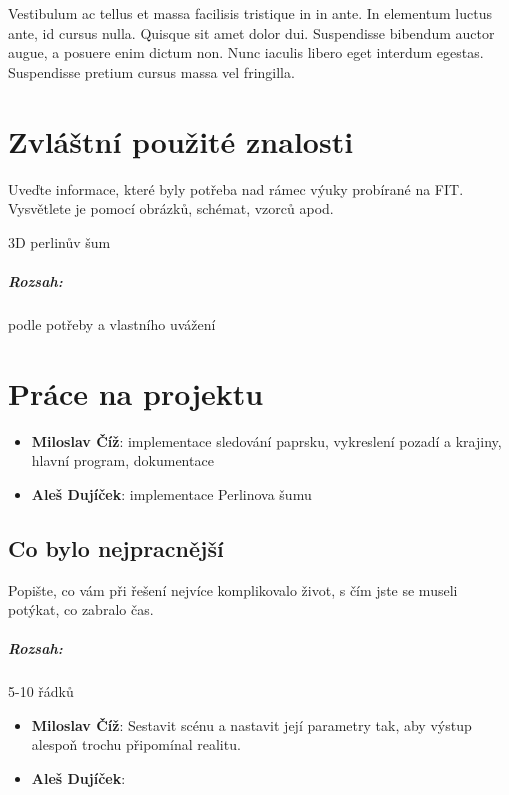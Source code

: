\documentclass[12pt,a4paper,titlepage,final]{report}
\newcommand\AuthorA{Miloslav Číž}
\newcommand\AuthorB{Aleš Dujíček}
\begin{document}
Vestibulum ac tellus et massa facilisis tristique in in ante. In elementum luctus ante, id cursus nulla. Quisque sit amet dolor dui. Suspendisse bibendum auctor augue, a posuere enim dictum non. Nunc iaculis libero eget interdum egestas. Suspendisse pretium cursus massa vel fringilla.



\chapter{Zvláštní použité znalosti}

Uveďte informace, které byly potřeba nad rámec výuky probírané na FIT.
Vysvětlete je pomocí obrázků, schémat, vzorců apod.

3D perlinův šum

\paragraph{Rozsah:} podle potřeby a vlastního uvážení


\chapter{Práce na projektu}

\begin{itemize}
\item \textbf{\AuthorA}: implementace sledování paprsku, vykreslení pozadí a krajiny, hlavní program, dokumentace
\item \textbf{\AuthorB}: implementace Perlinova šumu
\end{itemize}

\section{Co bylo nejpracnější}

Popište, co vám při řešení nejvíce komplikovalo život, s čím jste se museli
potýkat, co zabralo čas.

\paragraph{Rozsah:} 5-10 řádků

\begin{itemize}
\item \textbf{\AuthorA}: Sestavit scénu a nastavit její parametry tak,
aby výstup alespoň trochu připomínal realitu.
\item \textbf{\AuthorB}:
\end{itemize}
\end{document}
